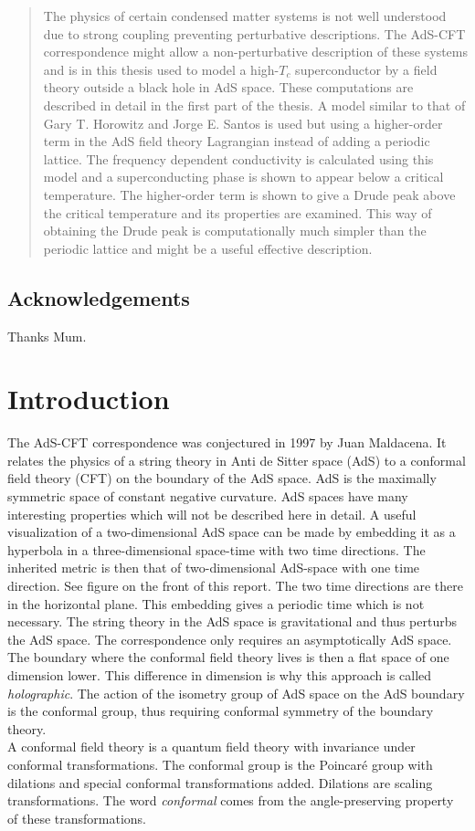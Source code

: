 \documentclass[12pt]{report}
\begin{document}
\begin{abstract}
The physics of certain condensed matter systems is not well understood due to strong coupling preventing perturbative descriptions.
The AdS-CFT correspondence might allow a non-perturbative description of these systems and is in this thesis used to model a high-$T_c$ superconductor by a field theory outside a black hole in AdS space.
These computations are described in detail in the first part of the thesis.
A model similar to that of Gary T. Horowitz and Jorge E. Santos\cite{horowitz} is used but using a higher-order term in the AdS field theory Lagrangian instead of adding a periodic lattice.
The frequency dependent conductivity is calculated using this model and a superconducting phase is shown to appear below a critical temperature. The higher-order term is shown to give a Drude peak above the critical temperature and its properties are examined. This way of obtaining the Drude peak is computationally much simpler than the periodic lattice and might be a useful effective description.

\end{abstract}

\section*{Acknowledgements}
Thanks Mum.
\tableofcontents
\chapter{Introduction}
The AdS-CFT correspondence was conjectured in 1997 by Juan Maldacena. It relates the physics of a string theory in Anti de Sitter space (AdS) to a conformal field theory (CFT) on the boundary of the AdS space. AdS is the maximally symmetric space of constant negative curvature. AdS spaces have many interesting properties which will not be described here in detail. A useful visualization of a two-dimensional AdS space can be made by embedding it as a hyperbola in a three-dimensional space-time with two time directions. The inherited metric is then that of two-dimensional AdS-space with one time direction. See figure on the front of this report. The two time directions are there in the horizontal plane. This embedding gives a periodic time which is not necessary. The string theory in the AdS space is gravitational and thus perturbs the AdS space. The correspondence only requires an asymptotically AdS space. The boundary where the conformal field theory lives is then a flat space of one dimension lower. This difference in dimension is why this approach is called \emph{holographic}. The action of the isometry group of AdS space on the AdS boundary is the conformal group, thus requiring conformal symmetry of the boundary theory.\\
A conformal field theory is a quantum field theory with invariance under conformal transformations. The conformal group is the Poincar\'{e} group with dilations and special conformal transformations added. Dilations are scaling transformations. The word \emph{conformal} comes from the angle-preserving property of these transformations.\\
\end{document}
